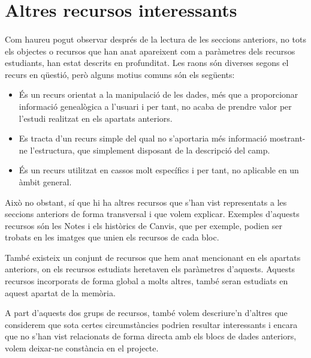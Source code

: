 \section{Altres recursos interessants}

    \paragraph{}
    Com haureu pogut observar després de la lectura de les seccions anteriors, no tots els objectes o recursos que han anat apareixent com a paràmetres dels recursos estudiants, han estat descrits en profunditat. Les raons són diverses segons el recurs en qüestió, però alguns motius comuns són els següents:

    \begin{itemize}
        \item És un recurs orientat a la manipulació de les dades, més que a proporcionar informació genealògica a l'usuari i per tant, no acaba de prendre valor per l'estudi realitzat en els apartats anteriors.
        \item Es tracta d'un recurs simple del qual no s'aportaria més informació mostrant-ne l'estructura, que simplement disposant de la descripció del camp.
        \item És un recurs utilitzat en cassos molt específics i per tant, no aplicable en un àmbit general.
    \end{itemize}

    Això no obstant, sí que hi ha altres recursos que s'han vist representats a les seccions anteriors de forma transversal i que volem explicar. Exemples d'aquests recursos són les Notes i els històrics de Canvis, que per exemple, podien ser trobats en les imatges que unien els recursos de cada bloc.

    També existeix un conjunt de recursos que hem anat mencionant en els apartats anteriors, on els recursos estudiats heretaven els paràmetres d'aquests. Aquests recursos incorporats de forma global a molts altres, també seran estudiats en aquest apartat de la memòria.

    A part d'aquests dos grups de recursos, també volem descriure'n d'altres que considerem que sota certes circumstàncies podrien resultar interessants i encara que no s'han vist relacionats de forma directa amb els blocs de dades anteriors, volem deixar-ne constància en el projecte.

    
    
    
    
    
    
    
    
    
    
